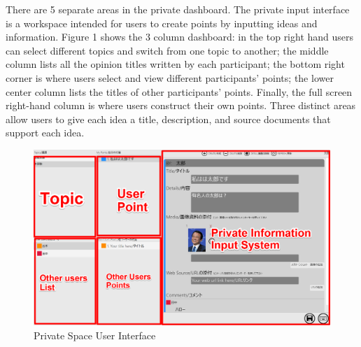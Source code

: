 \documentclass{sigchi}
\begin{document}
There are 5 separate areas in the private dashboard. The private input interface is a workspace intended for users to create points by inputting ideas and information. Figure 1 shows the 3 column dashboard: in the top right hand users can select different topics and switch from one topic to another; the middle column lists all the opinion titles written by each participant; the bottom right corner is where users select and view different participants' points; the lower center column lists the titles of other participants' points. Finally, the full screen right-hand column is where users construct their own points. Three distinct areas allow users to give each idea a title, description, and source documents that support each idea. 

\begin{figure}
\centering
\includegraphics[width=1.0\columnwidth]{private}
\caption{Private Space User Interface}
\label{fig:figure1}
\end{figure}
\end{document}
